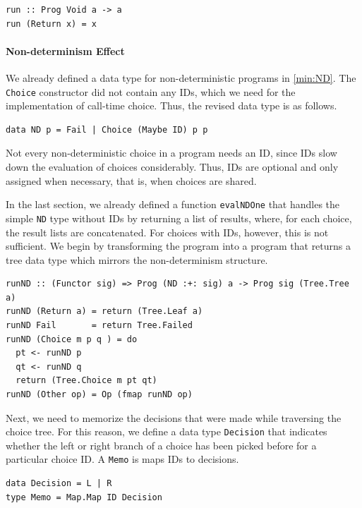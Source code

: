 \documentclass[a4paper, 11pt, fleqn, twoside]{scrreprt}
\newcommand{\todo}[1]{\marginpar{\textbf{TODO:} #1}}
\newcommand{\hinl}[1]{\texttt{#1}}
\begin{document}
\begin{verbatim}
run :: Prog Void a -> a
run (Return x) = x
\end{verbatim}

\paragraph{Non-determinism Effect}
We already defined a data type for non-deterministic programs in \autoref{min:ND}.
The \hinl{Choice} constructor did not contain any IDs, which we need for the implementation of call-time choice.
Thus, the revised data type is as follows.

\begin{verbatim}
data ND p = Fail | Choice (Maybe ID) p p
\end{verbatim}

Not every non-deterministic choice in a program needs an ID, since IDs slow down the evaluation of choices considerably.
Thus, IDs are optional and only assigned when necessary, that is, when choices are shared.

In the last section, we already defined a function \hinl{evalNDOne} that handles the simple \hinl{ND} type without IDs by returning a list of results, where, for each choice, the result lists are concatenated.
For choices with IDs, however, this is not sufficient.
We begin by transforming the program into a program that returns a tree data type which mirrors the non-determinism structure.
\todo{Keep tree structure?}
 
\begin{verbatim}
runND :: (Functor sig) => Prog (ND :+: sig) a -> Prog sig (Tree.Tree a)
runND (Return a) = return (Tree.Leaf a)
runND Fail       = return Tree.Failed
runND (Choice m p q ) = do
  pt <- runND p
  qt <- runND q
  return (Tree.Choice m pt qt)
runND (Other op) = Op (fmap runND op)
\end{verbatim}

Next, we need to memorize the decisions that were made while traversing the choice tree.
For this reason, we define a data type \hinl{Decision} that indicates whether the left or right branch of a choice has been picked before for a particular choice ID.
A \hinl{Memo} is maps IDs to decisions.

\begin{verbatim}
data Decision = L | R
type Memo = Map.Map ID Decision
\end{verbatim}
\end{document}

